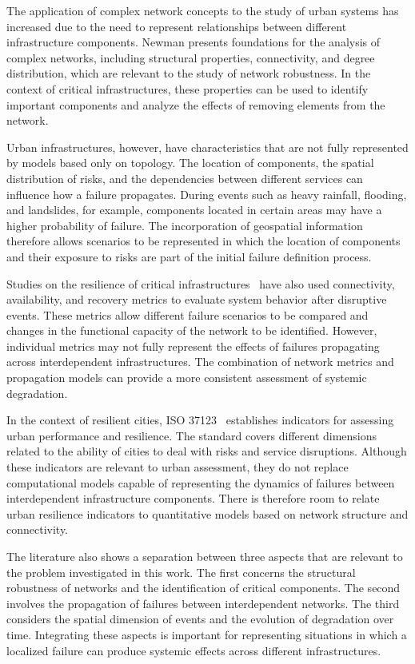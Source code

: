 \documentclass[journal]{IEEEtran}
\begin{document}
The application of complex network concepts to the study of urban systems has increased due to the need to represent relationships between different infrastructure components. Newman \cite{newman2018} presents foundations for the analysis of complex networks, including structural properties, connectivity, and degree distribution, which are relevant to the study of network robustness. In the context of critical infrastructures, these properties can be used to identify important components and analyze the effects of removing elements from the network.

Urban infrastructures, however, have characteristics that are not fully represented by models based only on topology. The location of components, the spatial distribution of risks, and the dependencies between different services can influence how a failure propagates. During events such as heavy rainfall, flooding, and landslides, for example, components located in certain areas may have a higher probability of failure. The incorporation of geospatial information therefore allows scenarios to be represented in which the location of components and their exposure to risks are part of the initial failure definition process.

Studies on the resilience of critical infrastructures~\cite{Karakoc2019, Nan2016A, Poulin2021} have also used connectivity, availability, and recovery metrics to evaluate system behavior after disruptive events. These metrics allow different failure scenarios to be compared and changes in the functional capacity of the network to be identified. However, individual metrics may not fully represent the effects of failures propagating across interdependent infrastructures. The combination of network metrics and propagation models can provide a more consistent assessment of systemic degradation.

In the context of resilient cities, ISO 37123~\cite{iso37123} establishes indicators for assessing urban performance and resilience. The standard covers different dimensions related to the ability of cities to deal with risks and service disruptions. Although these indicators are relevant to urban assessment, they do not replace computational models capable of representing the dynamics of failures between interdependent infrastructure components. There is therefore room to relate urban resilience indicators to quantitative models based on network structure and connectivity.

The literature also shows a separation between three aspects that are relevant to the problem investigated in this work. The first concerns the structural robustness of networks and the identification of critical components. The second involves the propagation of failures between interdependent networks. The third considers the spatial dimension of events and the evolution of degradation over time. Integrating these aspects is important for representing situations in which a localized failure can produce systemic effects across different infrastructures.
\end{document}
